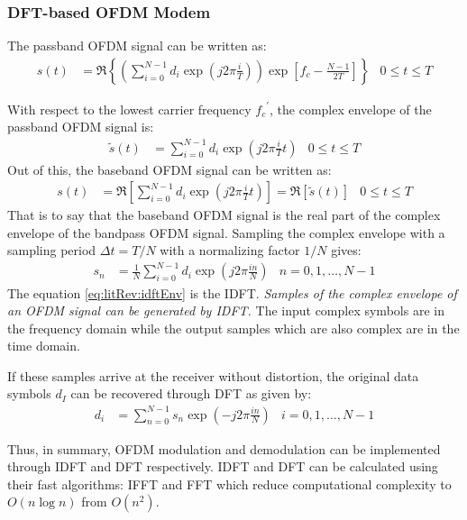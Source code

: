 \subsubsection{DFT-based OFDM Modem}
The passband OFDM signal can be written as:
\begin{align*}
	s(t) &= \Re \left\{ \left( \sum_{i=0}^{N-1} d_i \exp (j2\pi \frac{i}{T}) \right) \exp \left[f_c - \frac{N-1}{2T} \right] \right\} & 0 \leq t \leq T
\end{align*}
\begin{mathDef}
\end{mathDef}
With respect to the lowest carrier frequency \({f_c}^\prime\), the complex envelope of the passband OFDM signal is:
\begin{align*}
	\tilde{s}(t) &= \sum_{i=0}^{N-1} d_i \exp (j2\pi\frac{i}{T}t) & 0 \leq t \leq T
\end{align*}
Out of this, the baseband OFDM signal can be written as:
\begin{align*}
	s(t) &= \Re \left[ \sum_{i=0}^{N-1} d_i \exp (j2\pi\frac{i}{T}t) \right] = \Re [\tilde{s}(t)] & 0 \leq t \leq T
\end{align*}
That is to say that the baseband OFDM signal is the real part of the complex envelope of the bandpass OFDM signal. Sampling the complex envelope with a sampling period \(\Delta t = T/N\) with a normalizing factor \(1/N\) gives:
\begin{align}
	s_n &= \frac{1}{N} \sum_{i=0}^{N-1} d_i \exp \left( j2\pi \frac{in}{N} \right) & n = 0,1,\ldots,N-1
	\label{eq:litRev:idftEnv}
\end{align}
The equation \eqref{eq:litRev:idftEnv} is the \gls{IDFT}. \emph{Samples of the complex envelope of an OFDM signal can be generated by \gls{IDFT}\cite{fuqin}.} The input complex symbols are in the frequency domain while the output samples which are also complex are in the time domain.

If these samples arrive at the receiver without distortion, the original data symbols \(d_I\) can be recovered through \gls{DFT} as given by:
\begin{align*}
	d_i &= \sum_{n=0}^{N-1} s_n \exp \left(-j2\pi\frac{in}{N}\right) & i = 0,1,\ldots,N-1
\end{align*}

Thus, in summary, OFDM modulation and demodulation can be implemented through \gls{IDFT} and \gls{DFT} respectively. \gls{IDFT} and \gls{DFT} can be calculated using their fast algorithms: \gls{IFFT} and \gls{FFT} which reduce computational complexity to \(O(n\log n)\) from \(O(n^2)\).

